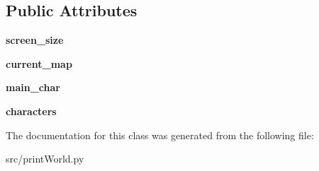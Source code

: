 \subsection*{\-Public \-Attributes}
\begin{DoxyCompactItemize}
\item 
\hypertarget{classsrc_1_1print_world_1_1_world_viewer_a58eb9c3aa33233ad30953553903642e9}{{\bfseries screen\-\_\-size}}\label{classsrc_1_1print_world_1_1_world_viewer_a58eb9c3aa33233ad30953553903642e9}

\item 
\hypertarget{classsrc_1_1print_world_1_1_world_viewer_ad63b7bffafc5dbc2af5100572e9d4b55}{{\bfseries current\-\_\-map}}\label{classsrc_1_1print_world_1_1_world_viewer_ad63b7bffafc5dbc2af5100572e9d4b55}

\item 
\hypertarget{classsrc_1_1print_world_1_1_world_viewer_a739f8f3c05bb674678ec3ec6c475398f}{{\bfseries main\-\_\-char}}\label{classsrc_1_1print_world_1_1_world_viewer_a739f8f3c05bb674678ec3ec6c475398f}

\item 
\hypertarget{classsrc_1_1print_world_1_1_world_viewer_a2a7a6e13cd7009be159a91f32804dedf}{{\bfseries characters}}\label{classsrc_1_1print_world_1_1_world_viewer_a2a7a6e13cd7009be159a91f32804dedf}

\end{DoxyCompactItemize}


\-The documentation for this class was generated from the following file\-:\begin{DoxyCompactItemize}
\item 
src/print\-World.\-py\end{DoxyCompactItemize}
